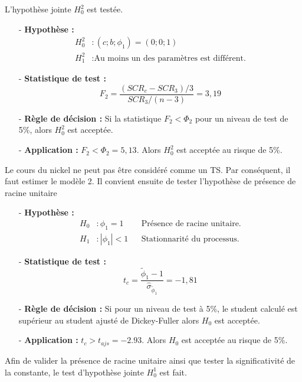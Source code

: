 %
L'hypothèse jointe $H_{0}^{2}$ est testée.
%
\begin{itemize}
\item[-]\textbf{Hypothèse :} 
\begin{equation*}
    \begin{split}
        H_{0}^{2} &: (c; b; \phi_{1}) = (0;0;1)\\
        H_{1}^{2} &: \text{Au moins un des paramètres est différent.}
    \end{split}
\end{equation*}
\item[-]\textbf{Statistique de test :}
\begin{equation*}
    F_{2} = \frac{(SCR_{c} - SCR_{3})/3}{SCR_{3}/(n-3)} = 3,19
\end{equation*}
\item[-]\textbf{Règle de décision :}  Si la statistique $F_{2} < \Phi_{2}$ pour un niveau de test de 5\%, alors $H_{0}^{2}$ est acceptée.
\item[-]\textbf{Application :} $F_{2} < \Phi_{2} = 5,13 $. Alors $H_{0}^{2}$ est acceptée au risque de 5\%. 
\end{itemize}
%
Le cours du nickel ne peut pas être considéré comme un TS. Par conséquent, il faut estimer le modèle 2. Il convient ensuite de tester l'hypothèse de présence de racine
unitaire
%
\begin{itemize}
\item[-]\textbf{ Hypothèse :} 
\begin{align*}
        H_{0} &: \phi_{1} = 1  & &\text{Présence de racine unitaire.}\\
        H_{1} &:|\phi_{1}| < 1   &  &\text{Stationnarité du processus.}
\end{align*}
\item[-]\textbf{Statistique de test :} 
\begin{equation*}
    t_{c} = \frac{\tilde{\phi}_{1}- 1}{\hat{\sigma}_{\tilde{\phi}_{1}}} = -1,81
\end{equation*}
\item[-]\textbf{Règle de décision :} Si pour un niveau de test à 5\%, le student calculé est supérieur au student ajusté de Dickey-Fuller alors $H_{0}$ est acceptée.
\item[-]\textbf{Application :} $t_{c} > t_{ajs} = -2.93$. Alors $H_{0}$ est acceptée au risque de 5\%.
\end{itemize}
%
Afin de valider la présence de racine unitaire ainsi que tester la significativité de la constante, le test d'hypothèse jointe $H_{0}^{1}$ est fait.

